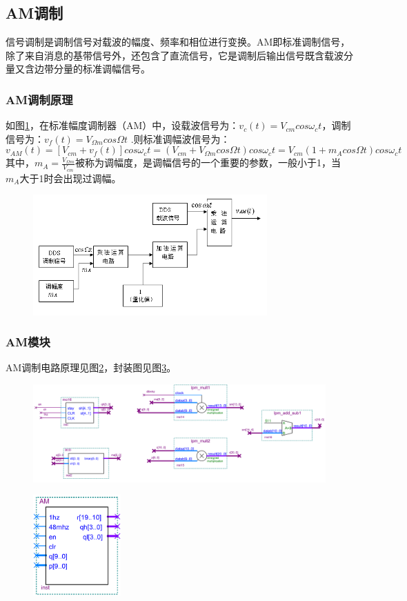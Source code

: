 \documentclass[12pt]{article}
\begin{document}
\subsection{AM调制}
信号调制是调制信号对载波的幅度、频率和相位进行变换。AM即标准调制信号，除了来自消息的基带信号外，还包含了直流信号，它是调制后输出信号既含载波分量又含边带分量的标准调幅信号。
\subsubsection{AM调制原理}
如图\ref{fig:119}，在标准幅度调制器（AM）中，设载波信号为：$v_c(t)=V_{cm}cos{\omega_c}t$，调制信号为：$v_f(t)=V_{\Omega m}cos{\Omega}t$ .则标准调幅波信号为：
 $$v_{AM}(t)=[V_{cm}+v_f(t)]cos\omega_ct=(V_{cm}+V_{\Omega m}cos\Omega t)cos\omega_ct=V_{cm}(1+m_Acos\Omega t)cos\omega_ct$$
其中，$m_A=\frac{V_{\Omega m}}{V_{cm}}$被称为调幅度，是调幅信号的一个重要的参数，一般小于1，当$m_A$大于1时会出现过调幅。
\begin{figure}[hp]
	\centering  
	\includegraphics[width=0.8\textwidth]{picture/image119.png} 
	\caption{}
	\label{fig:119}   
\end{figure}
\subsubsection{AM模块}
AM调制电路原理见图\ref{fig:am}，封装图见图\ref{fig:fengzhuangamfz}。
\begin{figure}[hp]
	\centering  
	\includegraphics[width=\textwidth]{picture/am.png} 
	\caption{}
	\label{fig:am}   
\end{figure}
\begin{figure}[hp]
	\centering  
	\includegraphics[width=0.3\textwidth]{picture/amfz.png} 
	\caption{}
	\label{fig:fengzhuangamfz}   
\end{figure}
\end{document}
